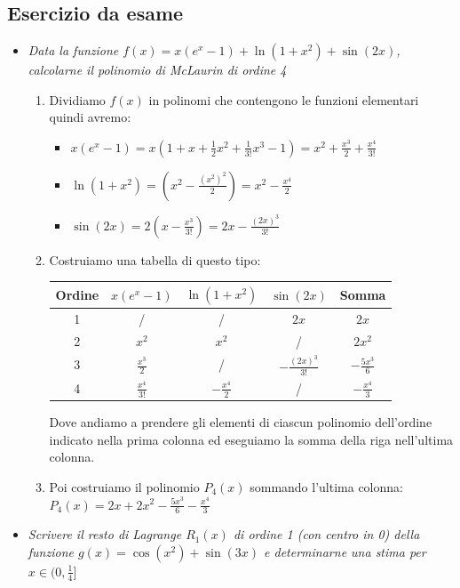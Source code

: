 \documentclass[10pt, a4paper]{article}
\begin{document}
    \subsection{Esercizio da esame}
        \begin{itemize}
            \item \textit{Data la funzione $f(x)=x(e^x-1)+\ln(1+x^2)+\sin(2x)$, calcolarne il polinomio di McLaurin di ordine 4} \begin{enumerate}
                \item Dividiamo $f(x)$ in polinomi che contengono le funzioni elementari quindi avremo: \begin{itemize}
                    \item $x(e^x-1)=x\left(1+x+\frac{1}{2}x^2+\frac{1}{3!}x^3-1\right)=x^2+\frac{x^3}{2}+\frac{x^4}{3!}$
                    \item $\ln(1+x^2)=\left(x^2-\frac{(x^2)^2}{2}\right)=x^2-\frac{x^4}{2}$
                    \item $\sin(2x)=2\left(x-\frac{x^3}{3!}\right)=2x-\frac{(2x)^3}{3!}$
                \end{itemize}
                \item Costruiamo una tabella di questo tipo: 
                \begin{center}
                    \begin{tabular}{| c | c | c | c | c |}
                        \hline
                        \textbf{Ordine} & $x(e^x-1)$ & $\ln(1+x^2)$ & $\sin(2x)$ & \textbf{Somma}\\
                        \hline
                        1 & / & / & $2x$ & $2x$ \\
                        \hline
                        2 & $x^2$ & $x^2$ & / & $2x^2$\\
                        \hline
                        3 & $\frac{x^3}{2}$ & / & $-\frac{(2x)^3}{3!}$ & $-\frac{5x^3}{6}$\\
                        \hline
                        4 & $\frac{x^4}{3!}$ & $-\frac{x^4}{2}$ & / & $-\frac{x^4}{3}$\\
                        \hline
                    \end{tabular}
                \end{center}
                Dove andiamo a prendere gli elementi di ciascun polinomio dell'ordine indicato nella prima colonna ed eseguiamo la somma della riga nell'ultima colonna.
                \item Poi costruiamo il polinomio $P_4(x)$ sommando l'ultima colonna: $P_4(x)=2x+2x^2-\frac{5x^3}{6}-\frac{x^4}{3}$
            \end{enumerate}
            \item \textit{Scrivere il resto di Lagrange $R_1(x)$ di ordine 1 (con centro in 0) della funzione $g(x)=\cos(x^2)+\sin(3x)$ e determinarne una stima per $x\in(0,\frac{1}{4}]$}
        \end{itemize}
\end{document}
